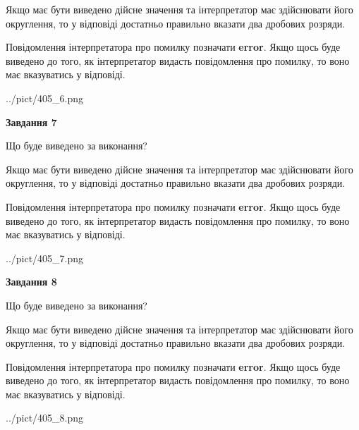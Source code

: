 \documentclass[12pt, ukrainian]{article}
\begin{document}
{\begin {Large}
Якщо має бути виведено дійсне значення та інтерпретатор має здійснювати його округлення, 
то у відповіді достатньо правильно вказати два дробових розряди.

Повідомлення інтерпретатора про помилку позначати \textbf{error}.
Якщо щось буде виведено до того, як інтерпретатор видасть повідомлення про помилку, 
то воно має вказуватись у відповіді. \par

\begin{center}
	{../pict/405_6.png}
\end{center}
\newpage

{\begin {center}\textbf{Завдання 7}\end {center}}\par
Що буде виведено за виконання? \par

Якщо має бути виведено дійсне значення та інтерпретатор має здійснювати його округлення, 
то у відповіді достатньо правильно вказати два дробових розряди.

Повідомлення інтерпретатора про помилку позначати \textbf{error}.
Якщо щось буде виведено до того, як інтерпретатор видасть повідомлення про помилку, 
то воно має вказуватись у відповіді. \par

\begin{center}
	{../pict/405_7.png}
\end{center}
\newpage

{\begin {center}\textbf{Завдання 8}\end {center}}\par
Що буде виведено за виконання? \par

Якщо має бути виведено дійсне значення та інтерпретатор має здійснювати його округлення, 
то у відповіді достатньо правильно вказати два дробових розряди.

Повідомлення інтерпретатора про помилку позначати \textbf{error}.
Якщо щось буде виведено до того, як інтерпретатор видасть повідомлення про помилку, 
то воно має вказуватись у відповіді. \par

\begin{center}
	{../pict/405_8.png}
\end{center}
\newpage


\end{Large}}
\end{document}
